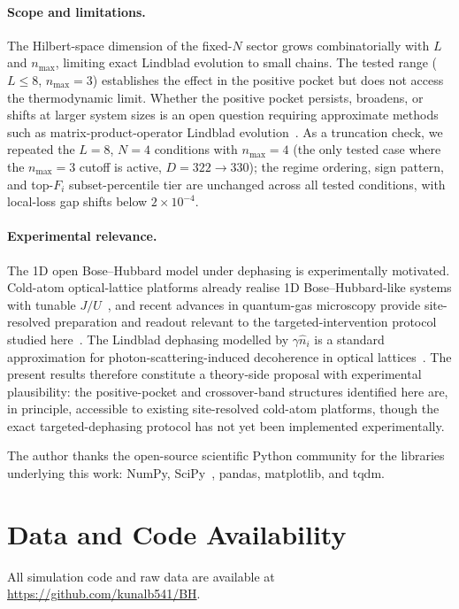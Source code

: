 \documentclass[aps,pra,reprint,amsmath,amssymb,longbibliography,floatfix]{revtex4-2}
\newcommand{\Fi}{F_i}
\begin{document}
\paragraph*{Scope and limitations.}
The Hilbert-space dimension of the fixed-$N$ sector grows combinatorially
with $L$ and $n_{\max}$, limiting exact Lindblad evolution to small chains.
The tested range ($L\leq8$, $n_{\max}=3$) establishes the effect in the
positive pocket but does not access the thermodynamic limit.
Whether the positive pocket persists, broadens, or shifts at larger system
sizes is an open question requiring approximate methods such as
matrix-product-operator Lindblad evolution~\cite{daley2014}.
As a truncation check, we repeated the $L=8$, $N=4$ conditions with
$n_{\max}=4$ (the only tested case where the $n_{\max}=3$ cutoff is active,
$D=322\to330$); the regime ordering, sign pattern, and top-$\Fi$
subset-percentile tier are unchanged across all tested conditions, with
local-loss gap shifts below $2\times10^{-4}$.

\paragraph*{Experimental relevance.}
The 1D open Bose--Hubbard model under dephasing is experimentally
motivated.
Cold-atom optical-lattice platforms already realise 1D Bose--Hubbard-like
systems with tunable $J/U$~\cite{jaksch1998,greiner2002}, and recent
advances in quantum-gas microscopy provide site-resolved preparation and
readout relevant to the targeted-intervention protocol studied
here~\cite{gross2021}.
The Lindblad dephasing modelled by $\gamma\hat{n}_i$ is a standard
approximation for photon-scattering-induced decoherence in optical
lattices~\cite{pichler2010,daley2014}.
The present results therefore constitute a theory-side proposal with
experimental plausibility: the positive-pocket and crossover-band
structures identified here are, in principle, accessible to existing
site-resolved cold-atom platforms, though the exact targeted-dephasing protocol has not yet been implemented
experimentally.

\begin{acknowledgments}
The author thanks the open-source scientific Python community for the
libraries underlying this work: NumPy, SciPy~\cite{scipy2020}, pandas,
matplotlib, and tqdm.
\end{acknowledgments}

\section*{Data and Code Availability}

All simulation code and raw data are available at
\href{https://github.com/kunalb541/BH}{https://github.com/kunalb541/BH}.


\end{document}
